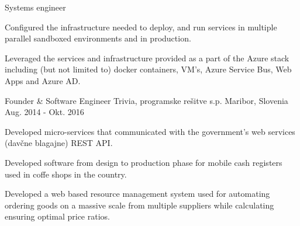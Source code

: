 \begin{cventries}
{\begin{cvitems}
      \end{cvitems}
    }
    \cventry
    {Systems engineer} %
    {} %
    {} %
    {} %
    {
      \begin{cvitems} %
        \item {Configured the infrastructure needed to deploy, and run services in multiple parallel sandboxed environments and in production.}
        \item {Leveraged the services and infrastructure provided as a part of the Azure stack including (but not limited to) docker containers, VM's, Azure Service Bus, Web Apps and Azure AD.\\}
      \end{cvitems}
    }

  \cventry
    {Founder \& Software Engineer} %
    {Trivia, programske rešitve s.p.} %
    {Maribor, Slovenia} %
    {Aug. 2014 - Okt. 2016} %
    {
      \begin{cvitems} %
        \item {Developed micro-services that communicated with the government's web services (davčne blagajne) REST API.}
        \item {Developed software from design to production phase for mobile cash registers used in coffe shops in the country.}
        \item {Developed a web based resource management system used for automating ordering goods on a massive scale from multiple suppliers while calculating ensuring optimal price ratios.}
      \end{cvitems}
    }

\end{cventries}
